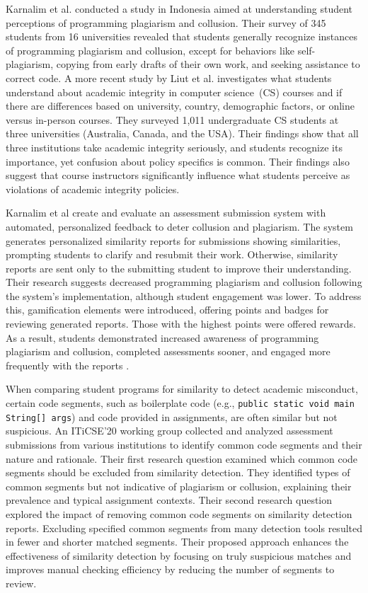 Karnalim et al. \cite{9678917} conducted a study in Indonesia aimed at understanding student perceptions of programming plagiarism and collusion. Their survey of 345 students from 16 universities revealed that students generally recognize instances of programming plagiarism and collusion, except for behaviors like self-plagiarism, copying from early drafts of their own work, and seeking assistance to correct code. A more recent study by Liut et al. \cite{10.1145/3626252.3630753} investigates what students understand about academic integrity in computer science~(CS) courses and if there are differences based on university, country, demographic factors, or online versus in-person courses. They surveyed 1,011 undergraduate CS students at three universities (Australia, Canada, and the USA). Their findings show that all three institutions take academic integrity seriously, and students recognize its importance, yet confusion about policy specifics is common. Their findings also suggest that course instructors significantly influence what students perceive as violations of academic integrity policies.

Karnalim et al \cite{10.1145/3506717} create and evaluate an assessment submission system with automated, personalized feedback to deter collusion and plagiarism. The system generates personalized similarity reports for submissions showing similarities, prompting students to clarify and resubmit their work. Otherwise, similarity reports are sent only to the submitting student to improve their understanding. Their research suggests decreased programming plagiarism and collusion following the system's implementation, although student engagement was lower. To address this, gamification elements were introduced, offering points and badges for reviewing generated reports. Those with the highest points were offered rewards. As a result, students demonstrated increased awareness of programming plagiarism and collusion, completed assessments sooner, and engaged more frequently with the reports \cite{10042043}.

When comparing student programs for similarity to detect academic misconduct, certain code segments, such as boilerplate code (e.g., \verb|public static void main String[] args|) and code provided in assignments, are often similar but not suspicious. An ITiCSE'20 working group collected and analyzed assessment submissions from various institutions to identify common code segments and their nature and rationale. Their first research question examined which common code segments should be excluded from similarity detection. They identified types of common segments but not indicative of plagiarism or collusion, explaining their prevalence and typical assignment contexts. Their second research question explored the impact of removing common code segments on similarity detection reports. Excluding specified common segments from many detection tools resulted in fewer and shorter matched segments. Their proposed approach enhances the effectiveness of similarity detection by focusing on truly suspicious matches and improves manual checking efficiency by reducing the number of segments to review.

